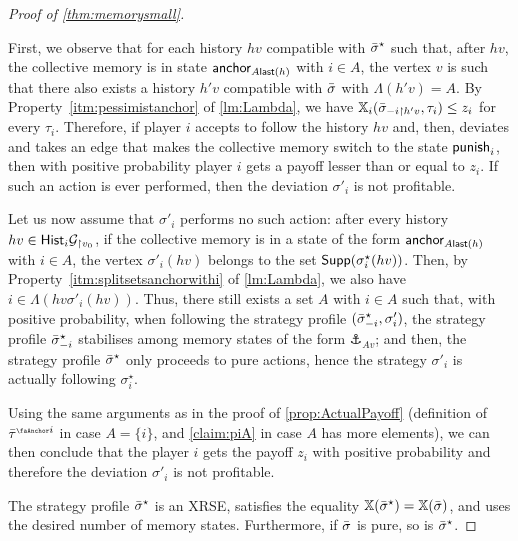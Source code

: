 \begin{proof}[Proof of \cref{thm:memorysmall}]
\begin{claimproof}
    First, we observe that for each history $hv$ compatible with ${\bar{\sigma}}^\star$ such that, after $hv$, the collective memory is in state $\mathsf{anchor}_{A \mathsf{last}(h)}$ with $i \in A$, the vertex $v$ is such that there also exists a history $h'v$ compatible with ${\bar{\sigma}}$ with $\Lambda(h'v) = A$.
    By Property~\ref{itm:pessimistanchor} of \cref{lm:Lambda}, we have $\mathbb{X}_i({\bar{\sigma}}_{-i\upharpoonright h'v}, \tau_i) \leq z_i$ for every $\tau_i$.
    Therefore, if player $i$ accepts to follow the history $hv$ and, then, deviates and takes an edge that makes the collective memory switch to the state $\mathsf{punish}_i$, then with positive probability player $i$ gets a payoff lesser than or equal to $z_i$.
    If such an action is ever performed, then the deviation $\sigma'_i$ is not profitable.

    Let us now assume that $\sigma'_i$ performs no such action: after every history $hv \in \mathsf{Hist}_i \mathcal{G}_{\upharpoonright v_0}$, if the collective memory is in a state of the form $\mathsf{anchor}_{A \mathsf{last}(h)}$ with $i \in A$, the vertex $\sigma'_i(hv)$ belongs to the set $\mathsf{Supp}(\sigma^\star_i(hv))$.
    Then, by Property~\ref{itm:splitsetsanchorwithi} of \cref{lm:Lambda}, we also have $i \in \Lambda(hv\sigma'_i(hv))$.
    Thus, there still exists a set $A$ with $i \in A$ such that, with positive probability, when following the strategy profile $({\bar{\sigma}}^\star_{-i}, \sigma'_i)$, the strategy profile ${\bar{\sigma}}^\star_{-i}$ stabilises among memory states of the form $\anchor_{A v}$; and then, the strategy profile ${\bar{\sigma}}^\star$ only proceeds to pure actions, hence the strategy $\sigma'_i$ is actually following $\sigma^\star_i$.

    Using the same arguments as in the proof of \cref{prop:ActualPayoff} (definition of $\btau^{\anch i}$ in case $A = \{i\}$, and \cref{claim:piA} in case $A$ has more elements), we can then conclude that the player $i$ gets the payoff $z_i$ with positive probability and therefore the deviation $\sigma'_i$ is not profitable.
    \end{claimproof}

    The strategy profile ${\bar{\sigma}}^\star$ is an XRSE, satisfies the equality $\mathbb{X}({\bar{\sigma}}^\star) = \mathbb{X}({\bar{\sigma}})$, and uses the desired number of memory states.
    Furthermore, if ${\bar{\sigma}}$ is pure, so is ${\bar{\sigma}}^\star$.
\end{proof}
